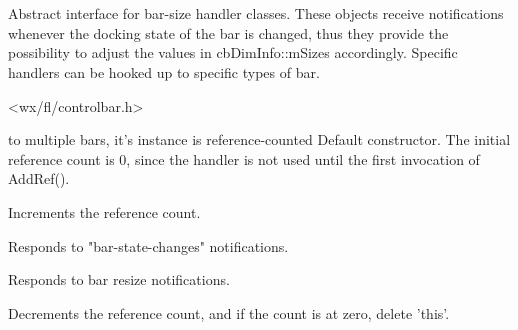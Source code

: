 %
%


\section{}\label{cbbardimhandlerbase}


Abstract interface for bar-size handler classes.
These objects receive notifications whenever the docking
state of the bar is changed, thus they provide the possibility
to adjust the values in cbDimInfo::mSizes accordingly.
Specific handlers can be hooked up to specific types of bar.




<wx/fl/controlbar.h>




\label{cbbardimhandlerbasecbbardimhandlerbase}


to multiple bars, it's instance is
reference-counted
Default constructor. The initial reference count is 0, since
the handler is not used until the first invocation of AddRef().


\label{cbbardimhandlerbaseaddref}


Increments the reference count.


\label{cbbardimhandlerbaseonchangebarstate}


Responds to "bar-state-changes" notifications.


\label{cbbardimhandlerbaseonresizebar}


Responds to bar resize notifications.


\label{cbbardimhandlerbaseremoveref}


Decrements the reference count, and if the count is at zero,
delete 'this'.

